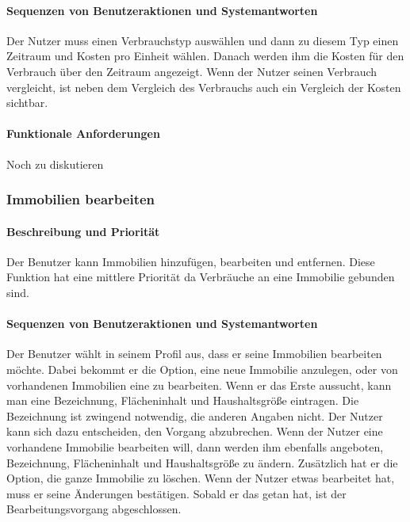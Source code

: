 \paragraph{Sequenzen von Benutzeraktionen und Systemantworten}
Der Nutzer muss einen Verbrauchstyp auswählen und dann zu diesem Typ einen Zeitraum und Kosten pro Einheit wählen.
Danach werden ihm die Kosten für den Verbrauch über den Zeitraum angezeigt.
Wenn der Nutzer seinen Verbrauch vergleicht, ist neben dem Vergleich des Verbrauchs auch ein Vergleich der Kosten
sichtbar.
\paragraph{Funktionale Anforderungen}
Noch zu diskutieren

\subsubsection{Immobilien bearbeiten}
\paragraph{Beschreibung und Priorität}
Der Benutzer kann Immobilien hinzufügen,
bearbeiten und entfernen. %
Diese Funktion hat eine mittlere Priorität da Verbräuche an eine Immobilie gebunden sind.

\paragraph{Sequenzen von Benutzeraktionen und Systemantworten}
Der Benutzer wählt in seinem Profil aus,
dass er seine Immobilien bearbeiten möchte.
Dabei bekommt er die Option, eine neue Immobilie anzulegen,
oder von vorhandenen Immobilien eine zu bearbeiten.
Wenn er das Erste aussucht, kann man eine Bezeichnung,
Flächeninhalt und Haushaltsgröße %
eintragen. Die Bezeichnung ist zwingend notwendig, %
die anderen Angaben nicht.
Der Nutzer kann sich dazu entscheiden, den Vorgang abzubrechen.
Wenn der Nutzer eine vorhandene Immobilie bearbeiten will,
dann werden ihm ebenfalls angeboten, Bezeichnung, Flächeninhalt und
Haushaltsgröße zu ändern.
Zusätzlich hat er die Option, die ganze Immobilie zu löschen.
Wenn der Nutzer etwas bearbeitet hat, muss er seine Änderungen bestätigen.
Sobald er das getan hat, ist der Bearbeitungsvorgang abgeschlossen.


